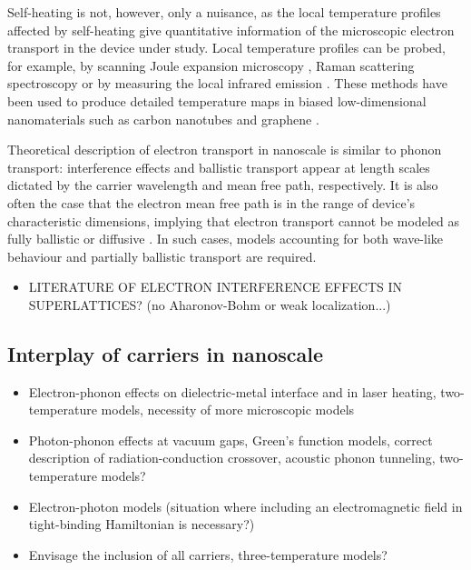 Self-heating is not, however, only a nuisance, as the local temperature profiles affected by self-heating give quantitative information of the microscopic electron transport in the device under study. Local temperature profiles can be probed, for example, by scanning Joule expansion microscopy \cite{varesi98}, Raman scattering spectroscopy \cite{calizo07} or by measuring the local infrared emission \cite{bae10}. These methods have been used to produce detailed temperature maps in biased low-dimensional nanomaterials such as carbon nanotubes \cite{estrada11,xie12} and graphene \cite{bae10,freitag09,chae10,freitag10}. %

Theoretical description of electron transport in nanoscale is similar to phonon transport: interference effects and ballistic transport appear at length scales dictated by the carrier wavelength and mean free path, respectively. \cite{} It is also often the case that the electron mean free path is in the range of device's characteristic dimensions, implying that electron transport cannot be modeled as fully ballistic or diffusive \cite{}. In such cases, models accounting for both wave-like behaviour and partially ballistic transport are required. 

\begin{itemize}
 \item LITERATURE OF ELECTRON INTERFERENCE EFFECTS IN SUPERLATTICES? (no Aharonov-Bohm or weak localization...)
\end{itemize}



\subsection{Interplay of carriers in nanoscale}
\label{sec:intro_coupling}
\begin{itemize}
 \item Electron-phonon effects on dielectric-metal interface and in laser heating, two-temperature models, necessity of more microscopic models
 \item Photon-phonon effects at vacuum gaps, Green's function models, correct description of radiation-conduction crossover, acoustic phonon tunneling, two-temperature models?
 \item Electron-photon models (situation where including an electromagnetic field in tight-binding Hamiltonian is necessary?)
 \item Envisage the inclusion of all carriers, three-temperature models?
\end{itemize}



